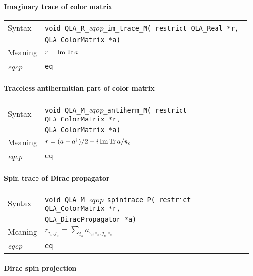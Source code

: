 \documentclass{article}
\renewcommand{\Im}{\mathop{\rm Im}}
\newcommand{\Tr}{\mathop{\rm Tr}}
\newcommand{\tReal}{QLA\ttdash Real }
\newcommand{\tColorMatrix}{QLA\ttdash ColorMatrix }
\newcommand{\tDiracPropagator}{QLA\ttdash DiracPropagator }
\newcommand{\namespace}{QLA}
\newcommand{\ttdash}{{\tt \_}}
\newcommand{\extraarg}{}
\newcommand{\protoUnarySingleTypesQual}[5]{{\tt void \namespace}\ttdash{\tt #1}\ttdash{\it eqop}\ttdash#2\ttdash{\tt #3}{\tt ( restrict #4 *r, }\\
  & {\tt #5 *a\extraarg)}}
\begin{document}
\paragraph{Imaginary trace of color matrix}

\begin{flushleft}
  \begin{tabular}{|l|l|}
  \hline
  Syntax      & \protoUnarySingleTypesQual{R}{\tt im\_trace}{M}{\tReal}{\tColorMatrix} \\
  \hline
  Meaning     & $r = \Im\Tr a$ \\
  \hline
  {\it eqop}  & {\tt eq} \\
  \hline
  \end{tabular}
\end{flushleft}

\paragraph{Traceless antihermitian part of color matrix}

\begin{flushleft}
  \begin{tabular}{|l|l|}
  \hline
  Syntax      & \protoUnarySingleTypesQual{M}{\tt antiherm}{M}{\tColorMatrix}{\tColorMatrix}\\
  \hline
  Meaning     & $r = (a - a^\dagger)/2 - i\Im \Tr a/n_c$ \\
  \hline
  {\it eqop}  & {\tt eq} \\
  \hline
  \end{tabular}
\end{flushleft}

\paragraph{Spin trace of Dirac propagator}

\begin{flushleft}
  \begin{tabular}{|l|l|}
  \hline
  Syntax      & \protoUnarySingleTypesQual{M}{\tt spintrace}{P}{\tColorMatrix}{\tDiracPropagator} \\
  \hline
  Meaning     & $r_{i_c,j_c} = \sum_{i_s} a_{i_c,i_s,j_c,i_s}$ \\
  \hline
  {\it eqop}  & {\tt eq} \\
  \hline
  \end{tabular}
\end{flushleft}

\paragraph{Dirac spin projection}
\end{document}
